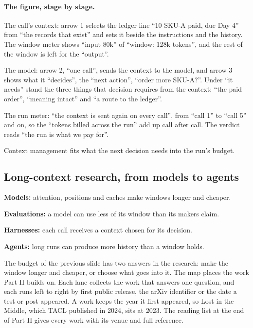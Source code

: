 \paragraph{The figure, stage by stage.}
\be
\item The call's context: arrow 1 selects the ledger line ``10 SKU-A paid, due Day 4'' from ``the records that exist'' and sets it beside the instructions and the history. The window meter shows ``input 80k'' of ``window: 128k tokens'', and the rest of the window is left for the ``output''.
\item The model: arrow 2, ``one call'', sends the context to the model, and arrow 3 shows what it ``decides'', the ``next action'', ``order more SKU-A?''. Under ``it needs'' stand the three things that decision requires from the context: ``the paid order'', ``meaning intact'' and ``a route to the ledger''.
\item The run meter: ``the context is sent again on every call'', from ``call 1'' to ``call 5'' and on, so the ``tokens billed across the run'' add up call after call. The verdict reads ``the run is what we pay for''.
\ee

\begin{takeaway}Context management fits what the next decision needs into the run's budget.\end{takeaway}

\subsection{Long-context research, from models to agents}
\label{sec:it-6-0}

\bi
\item \textbf{Models:} attention, positions and caches make windows longer and cheaper.
\item \textbf{Evaluations:} a model can use less of its window than its makers claim.
\item \textbf{Harnesses:} each call receives a context chosen for its decision.
\item \textbf{Agents:} long runs can produce more history than a window holds.
\ei

The budget of the previous slide has two answers in the research: make the window longer and cheaper, or choose what goes into it. The map places the work Part II builds on. Each lane collects the work that answers one question, and each runs left to right by first public release, the arXiv identifier or the date a test or post appeared. A work keeps the year it first appeared, so Lost in the Middle, which TACL published in 2024, sits at 2023. The reading list at the end of Part II gives every work with its venue and full reference.

